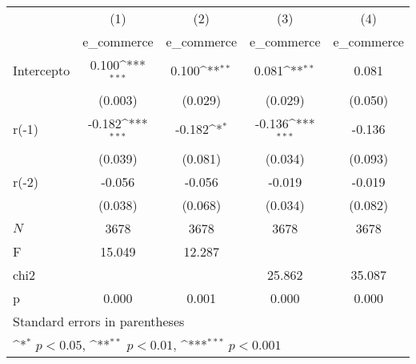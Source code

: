 {
\def\sym#1{\ifmmode^{#1}\else\(^{#1}\)\fi}
\begin{longtable}{l*{4}{c}}
\hline\hline\endfirsthead\hline\endhead\hline\endfoot\endlastfoot
            &\multicolumn{1}{c}{(1)}&\multicolumn{1}{c}{(2)}&\multicolumn{1}{c}{(3)}&\multicolumn{1}{c}{(4)}\\
            &\multicolumn{1}{c}{e\_commerce}&\multicolumn{1}{c}{e\_commerce}&\multicolumn{1}{c}{e\_commerce}&\multicolumn{1}{c}{e\_commerce}\\
\hline
Intercepto  &       0.100\sym{***}&       0.100\sym{**} &       0.081\sym{**} &       0.081         \\
            &     (0.003)         &     (0.029)         &     (0.029)         &     (0.050)         \\
r(-1)       &      -0.182\sym{***}&      -0.182\sym{*}  &      -0.136\sym{***}&      -0.136         \\
            &     (0.039)         &     (0.081)         &     (0.034)         &     (0.093)         \\
r(-2)       &      -0.056         &      -0.056         &      -0.019         &      -0.019         \\
            &     (0.038)         &     (0.068)         &     (0.034)         &     (0.082)         \\
\hline
\(N\)       &        3678         &        3678         &        3678         &        3678         \\
F           &      15.049         &      12.287         &                     &                     \\
chi2        &                     &                     &      25.862         &      35.087         \\
p           &       0.000         &       0.001         &       0.000         &       0.000         \\
\hline\hline
\multicolumn{5}{l}{\footnotesize Standard errors in parentheses}\\
\multicolumn{5}{l}{\footnotesize \sym{*} \(p<0.05\), \sym{**} \(p<0.01\), \sym{***} \(p<0.001\)}\\
\end{longtable}
}
